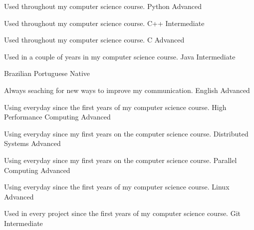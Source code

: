

\begin{cventries}

    \cventry
    {Used throughout my computer science course.}
    {Python} %
    {Advanced} %
    {}
    {}

    \cventry
    {Used throughout my computer science course.}
    {C++} %
    {Intermediate} %
    {}
    {}

    \cventry
    {Used throughout my computer science course.}
    {C} %
    {Advanced} %
    {}
    {}

    \cventry
    {Used in a couple of years in my computer science course.}
    {Java} %
    {Intermediate} %
    {}
    {}
\end{cventries}

\begin{cventries}

  \cventry
  {}
  {Brazilian Portuguese}
  {Native}
  {}
  {}

  \cventry
  {Always seaching for new ways to improve my communication.}
  {English}
  {Advanced}
  {}
  {}

\end{cventries}

\newpage
{}
\begin{cventries}

  \cventry
  {Using everyday since the first years of my computer science course.}
  {High Performance Computing}
  {Advanced}
  {}
  {}

  \cventry
  {Using everyday since my first years on the computer science course.}
  {Distributed Systems}
  {Advanced}
  {}
  {}

  \cventry
  {Using everyday since my first years on the computer science course.}
  {Parallel Computing}
  {Advanced}
  {}
  {}

  \cventry
  {Using everyday since the first years of my computer science course.}
  {Linux}
  {Advanced}
  {}
  {}

  \cventry
  {Used in every project since the first years of my computer science course.}
  {Git}
  {Intermediate}
  {}
  {}

\end{cventries}
